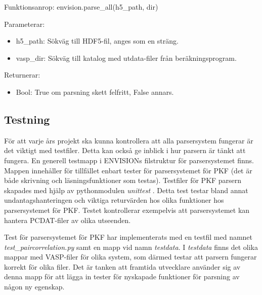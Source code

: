 Funktionsanrop: envision.parse\_all(h5\_path, dir)

Parameterar: 
\begin{itemize}
    \setlength\itemsep{0em}
    \item h5\_path: Sökväg till HDF5-fil, anges som en sträng.
    \item vasp\_dir: Sökväg till katalog med utdata-filer från beräkningsprogram.
\end{itemize}

Returnerar: 
\begin{itemize}
    \item Bool: True om parsning skett felfritt, False annars.
\end{itemize}

\subsection{Testning}
För att varje års projekt ska kunna kontrollera att alla parsersystem fungerar är det viktigt med testfiler. Detta kan också ge inblick i hur parsern är tänkt att fungera. En generell testmapp i ENVISIONs filstruktur för parsersystemet finns. Mappen innehåller för tillfället enbart tester för parsersystemet för PKF (det är både skrivning och läsningsfunktioner som testas). Testfiler för PKF parsern skapades med hjälp av pythonmodulen \textit{unittest} \cite{Unittest}. Detta test testar bland annat undantagshanteringen och viktiga returvärden hos olika funktioner hos parsersystemet för PKF. Testet kontrollerar exempelvis att parsersystemet kan hantera PCDAT-filer av olika utseenden. 

Test för parsersystemet för PKF har implementerats med en testfil med namnet \textit{test\_paircorrelation.py} samt en mapp vid namn \textit{testdata}. I \textit{testdata} finns det olika mappar med VASP-filer för olika system, som därmed testar att parsern fungerar korrekt för olika filer. Det är tanken att framtida utvecklare använder sig av denna mapp för att lägga in tester för nyskapade funktioner för parsning av någon ny egenskap. 


 



